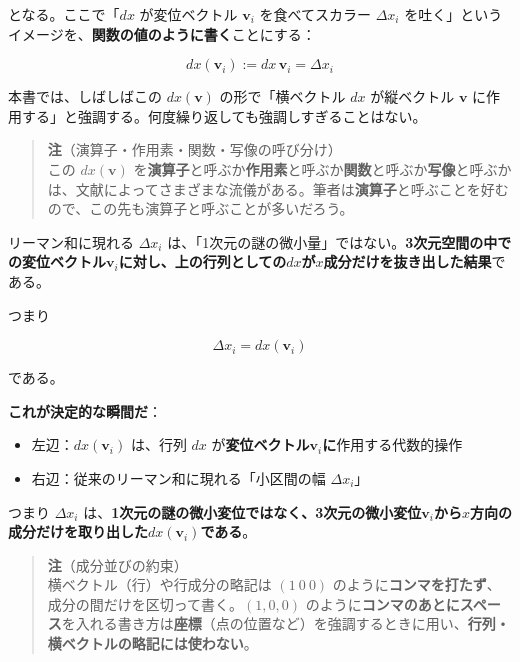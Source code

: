 \documentclass[a4paper,12pt,openany]{book}
\begin{document}
となる。ここで「\(dx\) が変位ベクトル \(\mathbf{v}_i\) を食べてスカラー
\(\Delta x_i\)
を吐く」というイメージを、\textbf{関数の値のように書く}ことにする：

\[
dx(\mathbf{v}_i)
:=
dx\,\mathbf{v}_i
=
\Delta x_i
\]

本書では、しばしばこの \(dx(\mathbf{v})\) の形で「横ベクトル \(dx\)
が縦ベクトル \(\mathbf{v}\)
に作用する」と強調する。何度繰り返しても強調しすぎることはない。

\begin{quote}
\textbf{注}（演算子・作用素・関数・写像の呼び分け）\\
この \(dx(\mathbf{v})\)
を\textbf{演算子}と呼ぶか\textbf{作用素}と呼ぶか\textbf{関数}と呼ぶか\textbf{写像}と呼ぶかは、文献によってさまざまな流儀がある。筆者は\textbf{演算子}と呼ぶことを好むので、この先も演算子と呼ぶことが多いだろう。
\end{quote}

リーマン和に現れる \(\Delta x_i\)
は、「1次元の謎の微小量」ではない。\textbf{3次元空間の中での変位ベクトル}\(\mathbf{v}_i\)\textbf{に対し、上の行列としての}\(dx\)\textbf{が}\(x\)\textbf{成分だけを抜き出した結果}である。

つまり

\[
\Delta x_i = dx(\mathbf{v}_i)
\]

である。

\textbf{これが決定的な瞬間だ}：

\begin{itemize}
\item
  左辺：\(dx(\mathbf{v}_i)\) は、行列 \(dx\)
  が\textbf{変位ベクトル}\(\mathbf{v}_i\)\textbf{に}作用する代数的操作
\item
  右辺：従来のリーマン和に現れる「小区間の幅 \(\Delta x_i\)」
\end{itemize}

つまり \(\Delta x_i\)
は、\textbf{1次元の謎の微小変位ではなく、3次元の微小変位}\(\mathbf{v}_i\)\textbf{から}\(x\)\textbf{方向の成分だけを取り出した}\(dx(\mathbf{v}_i)\)\textbf{である}。

\begin{quote}
\textbf{注}（成分並びの約束）\\
横ベクトル（行）や行成分の略記は \((1\ 0\ 0)\)
のように\textbf{コンマを打たず}、成分の間だけを区切って書く。\((1, 0, 0)\)
のように\textbf{コンマのあとにスペース}を入れる書き方は\textbf{座標}（点の位置など）を強調するときに用い、\textbf{行列・横ベクトルの略記には使わない}。
\end{quote}
\end{document}
